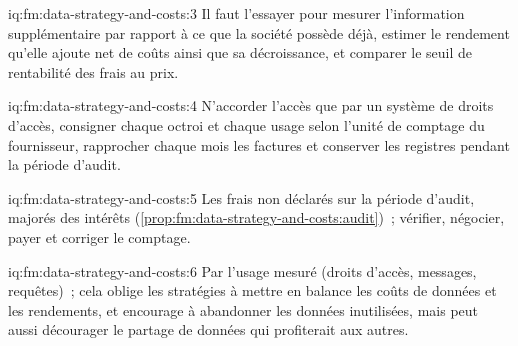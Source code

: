 \begin{solution}{iq:fm:data-strategy-and-costs:3}
Il faut l'essayer pour mesurer l'information supplémentaire par rapport à ce que la société possède déjà, estimer le rendement qu'elle ajoute net de coûts ainsi que sa décroissance, et comparer
le seuil de rentabilité des frais au prix.
\end{solution}

\begin{solution}{iq:fm:data-strategy-and-costs:4}
N'accorder l'accès que par un système de droits d'accès, consigner chaque octroi et chaque usage selon l'unité de comptage du fournisseur, rapprocher chaque mois les factures et conserver
les registres pendant la période d'audit.
\end{solution}

\begin{solution}{iq:fm:data-strategy-and-costs:5}
Les frais non déclarés sur la période d'audit, majorés des intérêts (\cref{prop:fm:data-strategy-and-costs:audit})~; vérifier, négocier, payer et corriger le
comptage.
\end{solution}

\begin{solution}{iq:fm:data-strategy-and-costs:6}
Par l'usage mesuré (droits d'accès, messages, requêtes)~; cela oblige les stratégies à mettre en balance les coûts de données et les rendements, et encourage à abandonner les données inutilisées,
mais peut aussi décourager le partage de données qui profiterait aux autres.
\end{solution}
